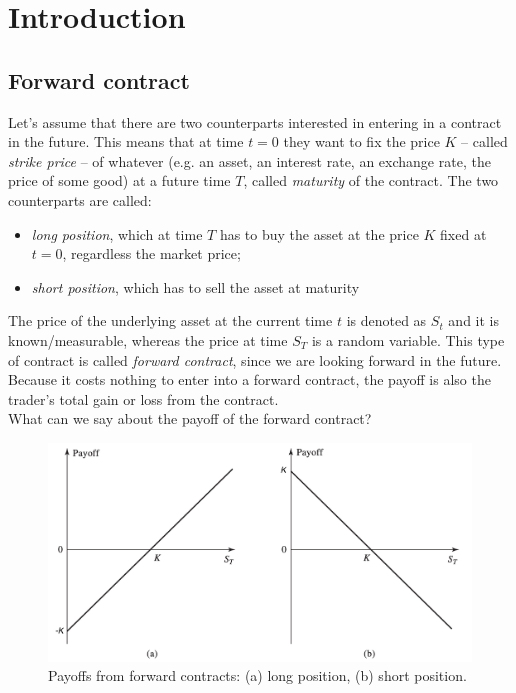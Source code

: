 \chapter{Introduction} %
\section{Forward contract} 
Let's assume that there are two counterparts interested in entering in a contract in the future. This means that at time $t=0$ they want to fix the price $K$ -- called \emph{strike price} -- of whatever (e.g. an asset, an interest rate, an exchange rate, the price of some good) at a future time $T$, called \emph{maturity} of the contract. The two counterparts are called:
\begin{itemize}
    \item \emph{long position}, which at time $T$ has to buy the asset at the price $K$ fixed at $t=0$, regardless the market price;
    \item \emph{short position}, which has to sell the asset at maturity
\end{itemize}
The price of the underlying asset at the current time $t$ is denoted as $S_t$ and it is known/measurable, whereas the price at time $S_T$ is a random variable. This type of contract is called \emph{forward contract}, since we are looking forward in the future. Because it costs nothing to enter into a forward contract, the payoff is also the trader’s total gain or loss from the contract.\\
What can we say about the payoff of the forward contract?
\begin{figure}
    \centering
    \includegraphics[scale=0.2]{fig/fc_payoff.png}
    \caption{Payoffs from forward contracts: (a) long position, (b) short position.}
    \label{fig:fc_payoff}
\end{figure}
